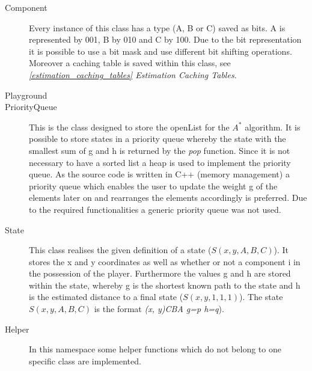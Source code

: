 \documentclass{article}
\begin{document}
\begin{description}
    \item[Component] Every instance of this class has a type (A, B or C) saved as bits. A is represented by 001, B by 010 and C by 100. Due to the bit representation it is possible to use a bit mask and use different bit shifting operations. Moreover a caching table is saved within this class, see \textit{\ref{estimation_caching_tables} Estimation Caching Tables}.
    \item[Playground]
    \item[PriorityQueue] This is the class designed to store the openList for the $A^*$ algorithm. It is possible to store states in a priority queue whereby the state with the smallest sum of g and h is returned by the \textit{pop} function. Since it is not necessary to have a sorted list a heap is used to implement the priority queue. As the source code is written in C++ (memory management) a priority queue which enables the user to update the weight g of the elements later on and rearranges the elements accordingly is preferred. Due to the required functionalities a generic priority queue was not used.
    \item[State] This class realises the given definition of a state ($S(x,y,A,B,C)$). It stores the x and y coordinates as well as whether or not a component i in the possession of the player. Furthermore the values g and h are stored within the state, whereby g is the shortest known path to the state and h is the estimated distance to a final state ($S(x,y,1,1,1)$). The state $S(x,y,A,B,C)$ is the format \textit{(x, y)CBA g=p h=q}).
    \item[Helper] In this namespace some helper functions which do not belong to one specific class are implemented.
\end{description}

\end{document}
